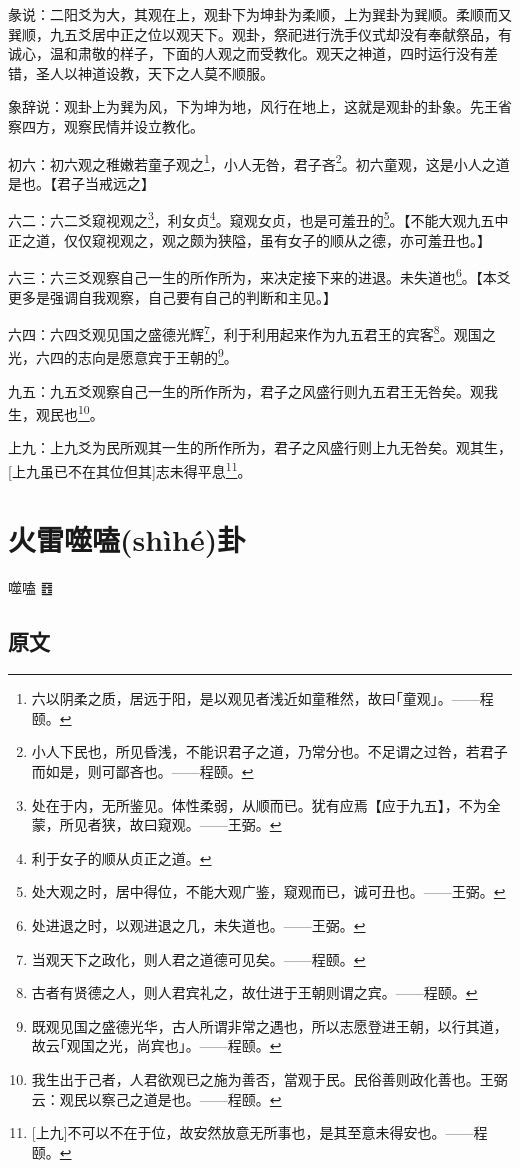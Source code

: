 \documentclass[12pt,oneside]{book}
\begin{document}
彖说：二阳爻为大，其观在上，观卦下为坤卦为柔顺，上为巽卦为巽顺。柔顺而又巽顺，九五爻居中正之位以观天下。观卦，祭祀进行洗手仪式却没有奉献祭品，有诚心，温和肃敬的样子，下面的人观之而受教化。观天之神道，四时运行没有差错，圣人以神道设教，天下之人莫不顺服。

象辞说：观卦上为巽为风，下为坤为地，风行在地上，这就是观卦的卦象。先王省察四方，观察民情并设立教化。

初六：初六观之稚嫩若童子观之\footnote{六以阴柔之质，居远于阳，是以观见者浅近如童稚然，故曰｢童观｣。——程颐。}，小人无咎，君子吝\footnote{小人下民也，所见昏浅，不能识君子之道，乃常分也。不足谓之过咎，若君子而如是，则可鄙吝也。——程颐。}。初六童观，这是小人之道是也。【君子当戒远之】

六二：六二爻窥视观之\footnote{处在于内，无所鉴见。体性柔弱，从顺而已。犹有应焉【应于九五】，不为全蒙，所见者狭，故曰窥观。——王弼。}，利女贞\footnote{利于女子的顺从贞正之道。}。窥观女贞，也是可羞丑的\footnote{处大观之时，居中得位，不能大观广鉴，窥观而已，诚可丑也。——王弼。}。【不能大观九五中正之道，仅仅窥视观之，观之颇为狭隘，虽有女子的顺从之德，亦可羞丑也。】

六三：六三爻观察自己一生的所作所为，来决定接下来的进退。未失道也\footnote{处进退之时，以观进退之几，未失道也。——王弼。}。【本爻更多是强调自我观察，自己要有自己的判断和主见。】

六四：六四爻观见国之盛德光辉\footnote{当观天下之政化，则人君之道德可见矣。——程颐。}，利于利用起来作为九五君王的宾客\footnote{古者有贤德之人，则人君宾礼之，故仕进于王朝则谓之宾。——程颐。}。观国之光，六四的志向是愿意宾于王朝的\footnote{既观见国之盛德光华，古人所谓非常之遇也，所以志愿登进王朝，以行其道，故云｢观国之光，尚宾也｣。——程颐。}。

九五：九五爻观察自己一生的所作所为，君子之风盛行则九五君王无咎矣。观我生，观民也\footnote{我生出于己者，人君欲观已之施为善否，當观于民。民俗善则政化善也。王弼云：观民以察己之道是也。——程颐。}。

上九：上九爻为民所观其一生的所作所为，君子之风盛行则上九无咎矣。观其生，[上九虽已不在其位但其]志未得平息\footnote{[上九]不可以不在于位，故安然放意无所事也，是其至意未得安也。——程颐。}。


\chapter{火雷噬嗑(shìhé)卦}
噬嗑 {\Large ䷔}

\section{原文}
\end{document}
